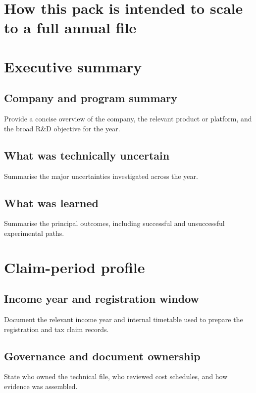 \documentclass[11pt]{article}
\begin{document}
\RDTitlePage
\tableofcontents
\clearpage

\section{How this pack is intended to scale to a full annual file}

\section{Executive summary}
\subsection{Company and program summary}
Provide a concise overview of the company, the relevant product or platform, and the broad R\&D objective for the year.

\subsection{What was technically uncertain}
Summarise the major uncertainties investigated across the year.

\subsection{What was learned}
Summarise the principal outcomes, including successful and unsuccessful experimental paths.

\section{Claim-period profile}
\RDMetaTable

\subsection{Income year and registration window}
Document the relevant income year and internal timetable used to prepare the registration and tax claim records.

\subsection{Governance and document ownership}
State who owned the technical file, who reviewed cost schedules, and how evidence was assembled.
\end{document}
